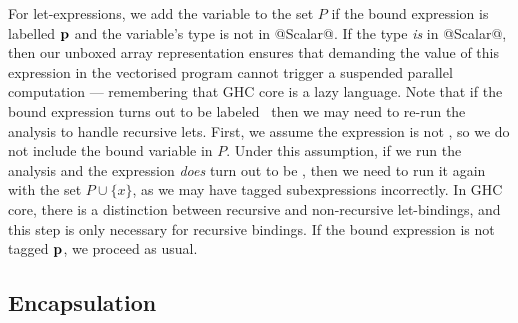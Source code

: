 For let-expressions, we add the variable to the set $P$ if the bound expression is labelled $\mathbf{p}$ and the variable's type is not in @Scalar@. If the type \emph{is} in @Scalar@, then our unboxed array representation ensures that demanding the value of this expression in the vectorised program cannot trigger a suspended parallel computation --- remembering that GHC core is a lazy language. Note that if the bound expression turns out to be labeled \AVP \ then we may need to re-run the analysis to handle recursive lets. First, we assume the expression is not \AVP, so we do not include the bound variable in $P$. Under this assumption, if we run the analysis and the expression \emph{does} turn out to be \AVP, then we need to run it again with the set $P \cup \{x\}$, as we may have tagged subexpressions incorrectly. In GHC core, there is a distinction between recursive and non-recursive let-bindings, and this step is only necessary for recursive bindings. If the bound expression is not tagged $\mathbf{p}$, we proceed as usual.


\subsection{Encapsulation}

